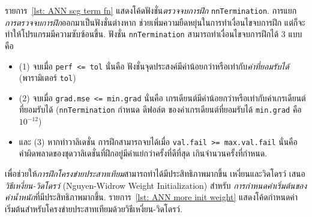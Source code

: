

รายการ~\ref{lst: ANN scg term fn} แสดงโค้ดฟังชั่น\textit{ตรวจจบการฝึก} \texttt{nnTermination}.
การแยก\textit{การตรวจจบการฝึก}ออกมาเป็นฟังชั่นต่างหาก ช่วยเพิ่มความยืดหยุ่นในการทำเงื่อนไขจบการฝึก
แต่ก็จะทำให้โปรแกรมมีความซับซ้อนขึ้น.
ฟังชั่น \texttt{nnTermination} สามารถทำเงื่อนไขจบการฝึกได้ $3$ แบบ คือ
%
\begin{itemize}
\item (1) จบเมื่อ \texttt{perf <= tol}
นั่นคือ ฟังชั่นจุดประสงค์มีค่าน้อยกว่าหรือเท่ากับ\textit{ค่าที่ยอมรับได้} (พารามิเตอร์ \texttt{tol})

\item (2) จบเมื่อ \texttt{grad.mse <= min.grad} 
นั่นคือ เกรเดียนต์มีค่าน้อยกว่าหรือเท่ากับค่าเกรเดียนต์ที่ยอมรับได้ 
(\texttt{nnTermination} กำหนด ดีฟอล์ต ของค่าเกรเดียนต์ที่ยอมรับได้ \texttt{min.grad} คือ $10^{-12}$)

\item และ (3) หากทำวาลิเดชั่น การฝึกสามารถจบได้เมื่อ \texttt{val.fail >= max.val.fail} 
นั่นคือ ค่าผิดพลาดของชุดวาลิเดชั่นที่ฝึกอยู่มีค่าแย่กว่าครั้งที่ดีที่สุด เกินจำนวนครั้งที่กำหนด.
\end{itemize}




%

เพื่อช่วยให้\textit{การฝึกโครงข่ายประสาทเทียม}สามารถทำได้มีประสิทธิภาพมากขึ้น 
เหงี่ยนและวิดโดรว์ เสนอ\textit{วิธีเหงี่ยน-วิดโดรว์} (Nguyen-Widrow Weight Initialization\cite{NguyenWidrow1990a}) สำหรับ \textit{การกำหนดค่าเริ่มต้นของค่าน้ำหนัก}ที่มีประสิทธิภาพมากขึ้น.
รายการ~\ref{lst: ANN more init weight} แสดงโค้ดกำหนดค่าเริ่มต้นสำหรับโครงข่ายประสาทเทียมด้วยวิธีเหงี่ยน-วิดโดรว์.



